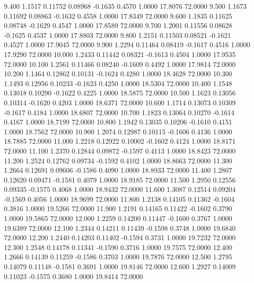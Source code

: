    9.400   1.1517   0.11752   0.08968  -0.1635   0.4570   1.0000  17.8076  72.0000
   9.500   1.1673   0.11692   0.08863  -0.1632   0.4558   1.0000  17.8349  72.0000
   9.600   1.1835   0.11625   0.08748  -0.1629   0.4547   1.0000  17.8589  72.0000
   9.700   1.2001   0.11556   0.08628  -0.1625   0.4537   1.0000  17.8803  72.0000
   9.800   1.2151   0.11503   0.08521  -0.1621   0.4527   1.0000  17.9045  72.0000
   9.900   1.2294   0.11464   0.08419  -0.1617   0.4516   1.0000  17.9290  72.0000
  10.000   1.2433   0.11442   0.08321  -0.1613   0.4504   1.0000  17.9535  72.0000
  10.100   1.2561   0.11466   0.08240  -0.1609   0.4492   1.0000  17.9814  72.0000
  10.200   1.1464   0.12862   0.10131  -0.1624   0.4280   1.0000  18.4628  72.0000
  10.300   1.1493   0.12956   0.10233  -0.1623   0.4250   1.0000  18.5304  72.0000
  10.400   1.1548   0.13018   0.10290  -0.1622   0.4225   1.0000  18.5875  72.0000
  10.500   1.1623   0.13056   0.10314  -0.1620   0.4203   1.0000  18.6371  72.0000
  10.600   1.1714   0.13073   0.10309  -0.1617   0.4184   1.0000  18.6807  72.0000
  10.700   1.1823   0.13064   0.10270  -0.1614   0.4167   1.0000  18.7199  72.0000
  10.800   1.1942   0.13035   0.10206  -0.1610   0.4151   1.0000  18.7562  72.0000
  10.900   1.2074   0.12987   0.10115  -0.1606   0.4136   1.0000  18.7885  72.0000
  11.000   1.2218   0.12922   0.10002  -0.1602   0.4124   1.0000  18.8171  72.0000
  11.100   1.2370   0.12844   0.09872  -0.1597   0.4113   1.0000  18.8423  72.0000
  11.200   1.2524   0.12762   0.09734  -0.1592   0.4102   1.0000  18.8663  72.0000
  11.300   1.2664   0.12691   0.09606  -0.1586   0.4090   1.0000  18.8933  72.0000
  11.400   1.2807   0.12620   0.09471  -0.1581   0.4079   1.0000  18.9185  72.0000
  11.500   1.2950   0.12556   0.09335  -0.1575   0.4068   1.0000  18.9432  72.0000
  11.600   1.3087   0.12514   0.09204  -0.1569   0.4056   1.0000  18.9699  72.0000
  11.800   1.2138   0.14105   0.11362  -0.1604   0.3816   1.0000  19.5266  72.0000
  11.900   1.2191   0.14165   0.11422  -0.1602   0.3790   1.0000  19.5865  72.0000
  12.000   1.2259   0.14200   0.11447  -0.1600   0.3767   1.0000  19.6389  72.0000
  12.100   1.2344   0.14211   0.11439  -0.1598   0.3748   1.0000  19.6840  72.0000
  12.200   1.2440   0.14203   0.11402  -0.1594   0.3731   1.0000  19.7232  72.0000
  12.300   1.2548   0.14178   0.11341  -0.1590   0.3716   1.0000  19.7575  72.0000
  12.400   1.2666   0.14139   0.11259  -0.1586   0.3703   1.0000  19.7876  72.0000
  12.500   1.2795   0.14079   0.11148  -0.1581   0.3691   1.0000  19.8146  72.0000
  12.600   1.2927   0.14009   0.11023  -0.1575   0.3680   1.0000  19.8414  72.0000
